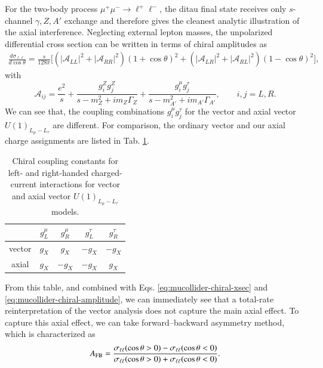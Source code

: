 \documentclass[onecolumn, aps, nofootinbib, prd, preprint, floats, floatfix, amsmath, amssymb, superscriptaddress, preprintnumbers]{revtex4-1}
\begin{document}
For the two-body process $\mu^+\mu^-\to\ell^+\ell^-$, the ditau final state receives only $s$-channel $\gamma,Z,A'$ exchange and therefore gives the cleanest analytic illustration of the axial interference. 
Neglecting external lepton masses, the unpolarized differential cross section can be written in terms of chiral amplitudes as
\begin{align}
\frac{d\sigma_{\ell\ell}}{d\cos\theta}=
\frac{s}{128\pi}
\bigg[ \left(|\mathcal A_{LL}|^2+|\mathcal A_{RR}|^2\right)(1+\cos\theta)^2 + \left(|\mathcal A_{LR}|^2+|\mathcal A_{RL}|^2\right)(1-\cos\theta)^2 \bigg],
\label{eq:mucollider-chiral-xsec}
\end{align}
with
\begin{equation}
\mathcal A_{ij}
=\frac{e^2}{s}+\frac{g_i^Z g_j^Z}{s-m_Z^2+i m_Z\Gamma_Z}+\frac{g_i^\mu g_j^\tau}{s-m_{A'}^2+i m_{A'}\Gamma_{A'}},
\qquad i,j=L,R .
\label{eq:mucollider-chiral-amplitude}
\end{equation}
We can see that, the coupling combinations $g_i^\mu g_j^\tau$ for the vector and axial vector $U(1)_{L_\mu-L_\tau}$ are different. For comparison, the ordinary vector and our axial charge assignments are listed in Tab. \ref{tab:vector-axial-charges}. 
\begin{table}[htbp]
    \centering
    \begin{tabular}{c|cccc}
    \hline
     & $g_L^\mu$ & $g_R^\mu$ & $g_L^\tau$ & $g_R^\tau$ \\
    \hline
    vector & $g_X$ & $g_X$ & $-g_X$ & $-g_X$ \\
    axial & $g_X$ & $-g_X$ & $-g_X$ & $g_X$ \\
    \hline
    \end{tabular}
    \caption{Chiral coupling constants for left- and right-handed charged-current interactions for vector and axial vector $U(1)_{L_\mu-L_\tau}$ models.}
    \label{tab:vector-axial-charges}
\end{table}
From this table, and combined with Eqs. \eqref{eq:mucollider-chiral-xsec} and \eqref{eq:mucollider-chiral-amplitude}, we can immediately see that a total-rate reinterpretation of the vector analysis does not capture the main axial effect. To capture this axial effect, we can take forward–backward asymmetry method, which is characterized as
\begin{equation}
A_{\rm FB}=
\frac{\sigma_{\ell\ell}(\cos\theta>0)-\sigma_{\ell\ell}(\cos\theta<0)}
{\sigma_{\ell\ell}(\cos\theta>0)+\sigma_{\ell\ell}(\cos\theta<0)}.
\label{eq:mucollider-afb}
\end{equation}
\end{document}
